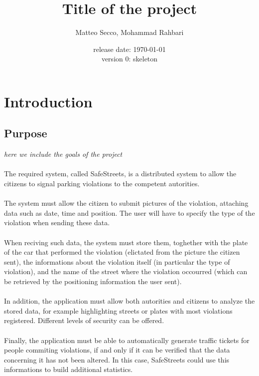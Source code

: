 \documentclass{article}
\title{Title of the project}
\date{release date: \today\\version 0: skeleton}
\author{Matteo Secco, Mohammad Rahbari}
\begin{document}
\maketitle
\newpage
\tableofcontents
\pagebreak
{}
\section{Introduction}
	\subsection{Purpose} \textit{here we	 include	 the	 goals of the project}
\paragraph{}The required system, called SafeStreets, is a distributed system to allow the citizens to signal parking violations to the competent autorities.
\paragraph{}The system must allow the citizen to submit pictures of the violation, attaching data such as date, time and position. The user will have to specify the type of the violation when sending these data. 
\paragraph{}When reciving such data, the system must store them, toghether with the plate of the car that performed the violation (elictated from the picture the citizen sent), the informations about the violation itself (in particular the type of violation), and the name of the street where the violation occourred (which can be retrieved by the positioning information the user sent).
\paragraph{}In addition, the application must allow both autorities and citizens to analyze the stored data, for example highlighting streets or plates with most violations registered. Different levels of security can be offered.
\paragraph{}Finally, the application must be able to automatically generate traffic tickets for people commiting violations, if and only if it can be verified that the data concerning it has not been altered. In this case, SafeStreets could use this informations to build additional statistics.
\end{document}
